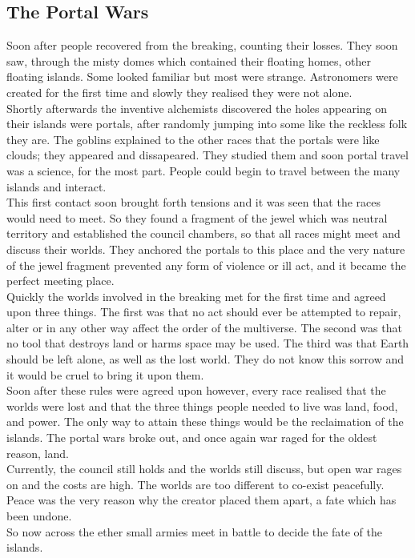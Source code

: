 \documentclass[a4paper,twocolumn]{article}
\begin{document}
\subsection{The Portal Wars}

Soon after people recovered from the breaking, counting their losses. They soon saw, through the misty domes which contained their floating homes, other floating islands. Some looked familiar but most were strange. Astronomers were created for the first time and slowly they realised they were not alone.\\
Shortly afterwards the inventive alchemists discovered the holes appearing on their islands were portals, after randomly jumping into some like the reckless folk they are. The goblins explained to the other races that the portals were like clouds; they appeared and dissapeared. They studied them and soon portal travel was a science, for the most part. People could begin to travel between the many islands and interact.\\
This first contact soon brought forth tensions and it was seen that the races would need to meet. So they found a fragment of the jewel which was neutral territory and established the council chambers, so that all races might meet and discuss their worlds. They anchored the portals to this place and the very nature of the jewel fragment prevented any form of violence or ill act, and it became the perfect meeting place.\\
Quickly the worlds involved in the breaking met for the first time and agreed upon three things. The first was that no act should ever be attempted to repair, alter or in any other way affect the order of the multiverse. The second was that no tool that destroys land or harms space may be used. The third was that Earth should be left alone, as well as the lost world. They do not know this sorrow and it would be cruel to bring it upon them.\\
Soon after these rules were agreed upon however, every race realised that the worlds were lost and that the three things people needed to live was land, food, and power. The only way to attain these things would be the reclaimation of the islands. The portal wars broke out, and once again war raged for the oldest reason, land.\\
Currently, the council still holds and the worlds still discuss, but open war rages on and the costs are high. The worlds are too different to co-exist peacefully. Peace was the very reason why the creator placed them apart, a fate which has been undone.\\
So now across the ether small armies meet in battle to decide the fate of the islands.
\end{document}
